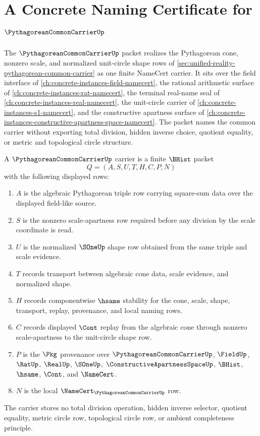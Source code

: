 \chapter{A Concrete Naming Certificate for $\PythagoreanCommonCarrierUp$}
\label{ch:concrete-instances-pythagorean-common-carrier-namecert}

The $\PythagoreanCommonCarrierUp$ packet realizes the Pythagorean cone, nonzero scale, and normalized unit-circle shape rows of \autoref{sec:unified-reality-pythagorean-common-carrier} as one finite NameCert carrier. It sits over the field interface of \autoref{ch:concrete-instances-field-namecert}, the rational arithmetic surface of \autoref{ch:concrete-instances-rat-namecert}, the terminal real-name seal of \autoref{ch:concrete-instances-real-namecert}, the unit-circle carrier of \autoref{ch:concrete-instances-s1-namecert}, and the constructive apartness surface of \autoref{ch:concrete-instances-constructive-apartness-space-namecert}. The packet names the common carrier without exporting total division, hidden inverse choice, quotient equality, or metric and topological circle structure.

\begin{definition}
\label{def:pythagorean-common-carrier}
A $\PythagoreanCommonCarrierUp$ carrier is a finite $\BHist$ packet
$$
Q=(A,S,U,T,H,C,P,N)
$$
with the following displayed rows:
\begin{enumerate}
\item $A$ is the algebraic Pythagorean triple row carrying square-sum data over the displayed field-like source.
\item $S$ is the nonzero scale-apartness row required before any division by the scale coordinate is read.
\item $U$ is the normalized $\SOneUp$ shape row obtained from the same triple and scale evidence.
\item $T$ records transport between algebraic cone data, scale evidence, and normalized shape.
\item $H$ records componentwise $\hsame$ stability for the cone, scale, shape, transport, replay, provenance, and local naming rows.
\item $C$ records displayed $\Cont$ replay from the algebraic cone through nonzero scale-apartness to the unit-circle shape row.
\item $P$ is the $\Pkg$ provenance over $\PythagoreanCommonCarrierUp$, $\FieldUp$, $\RatUp$, $\RealUp$, $\SOneUp$, $\ConstructiveApartnessSpaceUp$, $\BHist$, $\hsame$, $\Cont$, and $\NameCert$.
\item $N$ is the local $\NameCert_{\PythagoreanCommonCarrierUp}$ row.
\end{enumerate}
The carrier stores no total division operation, hidden inverse selector, quotient equality, metric circle row, topological circle row, or ambient completeness principle.
\end{definition}

